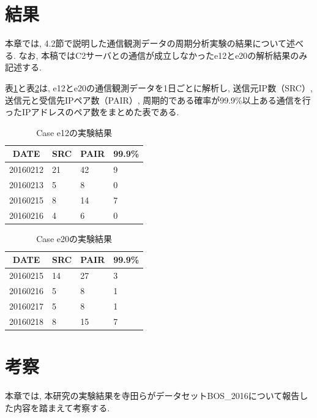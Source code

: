 \documentclass[twocolumn,9pt]{ltjsarticle}
\begin{document}
\section{結果}
本章では, 4.2節で説明した通信観測データの周期分析実験の結果について述べる. なお, 本稿ではC2サーバとの通信が成立しなかったe12とe20の解析結果のみ記述する. 

表\ref{tab:e12}と表\ref{tab:e20}は, e12とe20の通信観測データを1日ごとに解析し, 送信元IP数（SRC）, 送信元と受信先IPペア数（PAIR）, 周期的である確率が99.9\%以上ある通信を行ったIPアドレスのペア数をまとめた表である. 

\begin{table}[htbp]
    \centering
    \caption{Case e12の実験結果}

    \begin{tabular}{c||lll}
        \hline
        DATE & SRC & PAIR & 99.9\% \\
        \hline \hline
        20160212  & 21 & 42 & 9 \\
        20160213  & 5  & 8  & 0 \\
        20160215  & 8  & 14 & 7 \\
        20160216  & 4  & 6  & 0 \\
        \hline
    \end{tabular}

    \label{tab:e12}
\end{table}

\begin{table}[htbp]
    \centering
    \caption{Case e20の実験結果}

    \begin{tabular}{c||lll}
        \hline
        DATE & SRC & PAIR & 99.9\% \\
        \hline \hline
        20160215  & 14 & 27 & 3 \\
        20160216  & 5  & 8  & 1 \\
        20160217  & 5  & 8  & 1 \\
        20160218  & 8  & 15 & 7 \\
        \hline
    \end{tabular}

    \label{tab:e20}
\end{table}

\section{考察}
本章では, 本研究の実験結果を寺田らがデータセットBOS\_2016について報告した内容\cite{weko_175829_1}を踏まえて考察する. 
\end{document}
